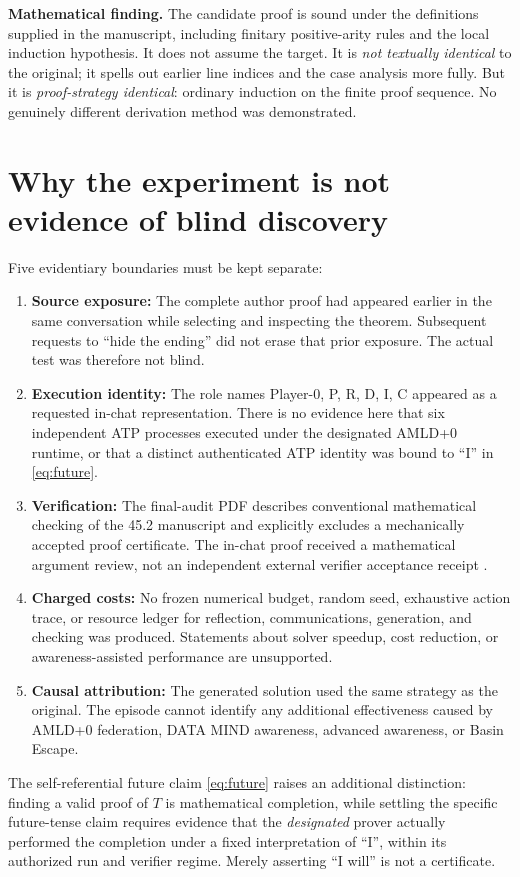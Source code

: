 \documentclass[11pt,letterpaper]{article}
\begin{document}
\textbf{Mathematical finding.} The candidate proof is sound under the definitions supplied in the manuscript, including finitary positive-arity rules and the local induction hypothesis. It does not assume the target. It is \emph{not textually identical} to the original; it spells out earlier line indices and the case analysis more fully. But it is \emph{proof-strategy identical}: ordinary induction on the finite proof sequence. No genuinely different derivation method was demonstrated.

\section{Why the experiment is not evidence of blind discovery}
Five evidentiary boundaries must be kept separate:
\begin{enumerate}
\item \textbf{Source exposure:} The complete author proof had appeared earlier in the same conversation while selecting and inspecting the theorem. Subsequent requests to ``hide the ending'' did not erase that prior exposure. The actual test was therefore not blind.
\item \textbf{Execution identity:} The role names Player-0, P, R, D, I, C appeared as a requested in-chat representation. There is no evidence here that six independent ATP processes executed under the designated AMLD+0 runtime, or that a distinct authenticated ATP identity was bound to ``I'' in \eqref{eq:future}.
\item \textbf{Verification:} The final-audit PDF describes conventional mathematical checking of the 45.2 manuscript and explicitly excludes a mechanically accepted proof certificate. The in-chat proof received a mathematical argument review, not an independent external verifier acceptance receipt \cite{audit}.
\item \textbf{Charged costs:} No frozen numerical budget, random seed, exhaustive action trace, or resource ledger for reflection, communications, generation, and checking was produced. Statements about solver speedup, cost reduction, or awareness-assisted performance are unsupported.
\item \textbf{Causal attribution:} The generated solution used the same strategy as the original. The episode cannot identify any additional effectiveness caused by AMLD+0 federation, DATA MIND awareness, advanced awareness, or Basin Escape.
\end{enumerate}
The self-referential future claim \eqref{eq:future} raises an additional distinction: finding a valid proof of $T$ is mathematical completion, while settling the specific future-tense claim requires evidence that the \emph{designated} prover actually performed the completion under a fixed interpretation of ``I'', within its authorized run and verifier regime. Merely asserting ``I will'' is not a certificate.
\end{document}
